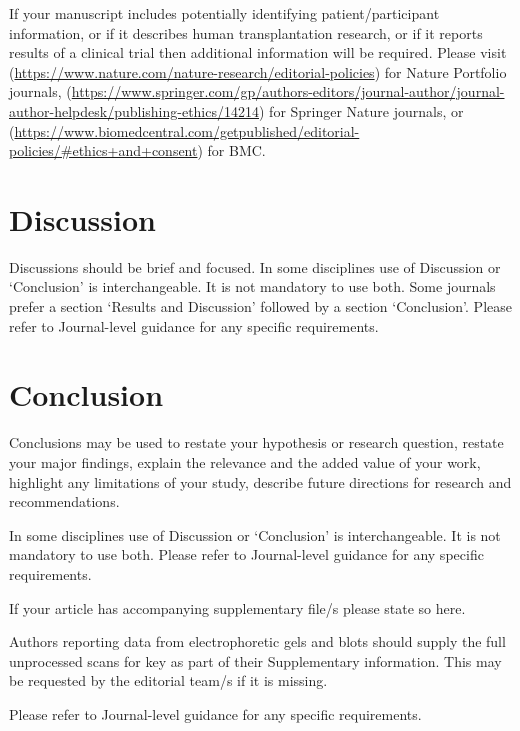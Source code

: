 \documentclass[sn-basic,pdflatex]{sn-jnl}
\theoremstyle{remark}
\theoremstyle{definition}
\begin{document}
If your manuscript includes potentially identifying patient/participant
information, or if it describes human transplantation research, or if it
reports results of a clinical trial then additional information will be
required. Please visit
(\url{https://www.nature.com/nature-research/editorial-policies}) for
Nature Portfolio journals,
(\url{https://www.springer.com/gp/authors-editors/journal-author/journal-author-helpdesk/publishing-ethics/14214})
for Springer Nature journals, or
(\url{https://www.biomedcentral.com/getpublished/editorial-policies/\#ethics+and+consent})
for BMC.

\section{Discussion}\label{sec12}

Discussions should be brief and focused. In some disciplines use of
Discussion or `Conclusion' is interchangeable. It is not mandatory to
use both. Some journals prefer a section `Results and Discussion'
followed by a section `Conclusion'. Please refer to Journal-level
guidance for any specific requirements.

\section{Conclusion}\label{sec13}

Conclusions may be used to restate your hypothesis or research question,
restate your major findings, explain the relevance and the added value
of your work, highlight any limitations of your study, describe future
directions for research and recommendations.

In some disciplines use of Discussion or `Conclusion' is
interchangeable. It is not mandatory to use both. Please refer to
Journal-level guidance for any specific requirements.

\backmatter


If your article has accompanying supplementary file/s please state so
here.

Authors reporting data from electrophoretic gels and blots should supply
the full unprocessed scans for key as part of their Supplementary
information. This may be requested by the editorial team/s if it is
missing.

Please refer to Journal-level guidance for any specific requirements.

\end{document}
